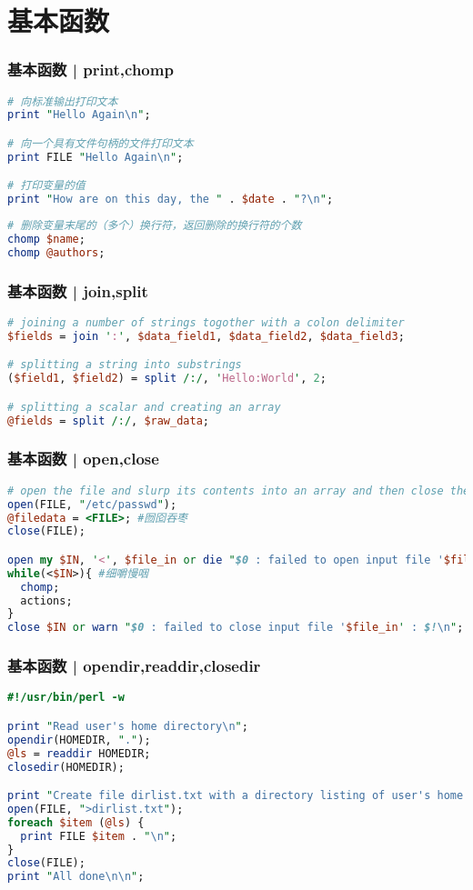 \section{基本函数}
\begin{frame}[fragile]
  \frametitle{基本函数 | \alert{print,chomp}}
\begin{lstlisting}[language=Perl]
# 向标准输出打印文本
print "Hello Again\n";

# 向一个具有文件句柄的文件打印文本
print FILE "Hello Again\n";

# 打印变量的值
print "How are on this day, the " . $date . "?\n";
\end{lstlisting}
\pause
\begin{lstlisting}[language=Perl]
# 删除变量末尾的（多个）换行符，返回删除的换行符的个数
chomp $name;
chomp @authors;
\end{lstlisting}
\end{frame}

\begin{frame}[fragile]
  \frametitle{基本函数 | \alert{join,split}}
\begin{lstlisting}[language=Perl]
# joining a number of strings togother with a colon delimiter
$fields = join ':', $data_field1, $data_field2, $data_field3;

# splitting a string into substrings
($field1, $field2) = split /:/, 'Hello:World', 2;

# splitting a scalar and creating an array
@fields = split /:/, $raw_data;
\end{lstlisting}
\end{frame}

\begin{frame}[fragile]
  \frametitle{基本函数 | \alert{open,close}}
\begin{lstlisting}[language=Perl]
# open the file and slurp its contents into an array and then close the file
open(FILE, "/etc/passwd");
@filedata = <FILE>; #囫囵吞枣
close(FILE);

open my $IN, '<', $file_in or die "$0 : failed to open input file '$file_in' : $!\n";
while(<$IN>){ #细嚼慢咽
  chomp;
  actions;
}
close $IN or warn "$0 : failed to close input file '$file_in' : $!\n";
\end{lstlisting}
\end{frame}

\begin{frame}[fragile]
  \frametitle{基本函数 | opendir,readdir,closedir}
\begin{lstlisting}[language=Perl]
#!/usr/bin/perl -w

print "Read user's home directory\n";
opendir(HOMEDIR, ".");
@ls = readdir HOMEDIR;
closedir(HOMEDIR);

print "Create file dirlist.txt with a directory listing of user's home dir\n";
open(FILE, ">dirlist.txt");
foreach $item (@ls) {
  print FILE $item . "\n";
}
close(FILE);
print "All done\n\n";
\end{lstlisting}
\end{frame}

